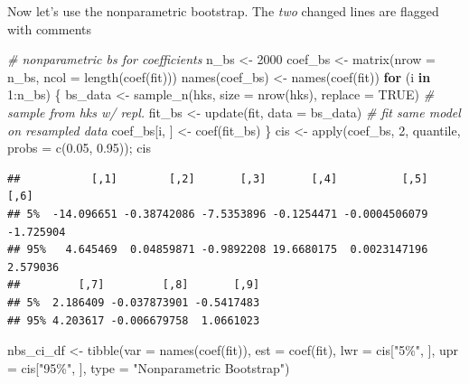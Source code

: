 \documentclass[
]{book}
\newenvironment{Shaded}{\begin{snugshade}}{\end{snugshade}}
\newcommand{\AttributeTok}[1]{\textcolor[rgb]{0.77,0.63,0.00}{#1}}
\newcommand{\CommentTok}[1]{\textcolor[rgb]{0.56,0.35,0.01}{\textit{#1}}}
\newcommand{\ConstantTok}[1]{\textcolor[rgb]{0.00,0.00,0.00}{#1}}
\newcommand{\ControlFlowTok}[1]{\textcolor[rgb]{0.13,0.29,0.53}{\textbf{#1}}}
\newcommand{\DecValTok}[1]{\textcolor[rgb]{0.00,0.00,0.81}{#1}}
\newcommand{\FloatTok}[1]{\textcolor[rgb]{0.00,0.00,0.81}{#1}}
\newcommand{\FunctionTok}[1]{\textcolor[rgb]{0.00,0.00,0.00}{#1}}
\newcommand{\NormalTok}[1]{#1}
\newcommand{\OtherTok}[1]{\textcolor[rgb]{0.56,0.35,0.01}{#1}}
\newcommand{\SpecialCharTok}[1]{\textcolor[rgb]{0.00,0.00,0.00}{#1}}
\newcommand{\StringTok}[1]{\textcolor[rgb]{0.31,0.60,0.02}{#1}}
\begin{document}
Now let's use the nonparametric bootstrap. The \emph{two} changed lines are flagged with comments

\begin{Shaded}
\begin{Highlighting}[]
\CommentTok{\# nonparametric bs for coefficients}
\NormalTok{n\_bs }\OtherTok{\textless{}{-}} \DecValTok{2000}  
\NormalTok{coef\_bs }\OtherTok{\textless{}{-}} \FunctionTok{matrix}\NormalTok{(}\AttributeTok{nrow =}\NormalTok{ n\_bs, }\AttributeTok{ncol =} \FunctionTok{length}\NormalTok{(}\FunctionTok{coef}\NormalTok{(fit)))}
\FunctionTok{names}\NormalTok{(coef\_bs) }\OtherTok{\textless{}{-}} \FunctionTok{names}\NormalTok{(}\FunctionTok{coef}\NormalTok{(fit))}
\ControlFlowTok{for}\NormalTok{ (i }\ControlFlowTok{in} \DecValTok{1}\SpecialCharTok{:}\NormalTok{n\_bs) \{}
\NormalTok{  bs\_data }\OtherTok{\textless{}{-}} \FunctionTok{sample\_n}\NormalTok{(hks, }\AttributeTok{size =} \FunctionTok{nrow}\NormalTok{(hks), }\AttributeTok{replace =} \ConstantTok{TRUE}\NormalTok{)  }\CommentTok{\# sample from hks w/ repl.}
\NormalTok{  fit\_bs }\OtherTok{\textless{}{-}} \FunctionTok{update}\NormalTok{(fit, }\AttributeTok{data =}\NormalTok{ bs\_data)                       }\CommentTok{\# fit same model on resampled data}
\NormalTok{  coef\_bs[i, ] }\OtherTok{\textless{}{-}} \FunctionTok{coef}\NormalTok{(fit\_bs)}
\NormalTok{\}}
\NormalTok{cis }\OtherTok{\textless{}{-}} \FunctionTok{apply}\NormalTok{(coef\_bs, }\DecValTok{2}\NormalTok{, quantile, }\AttributeTok{probs =} \FunctionTok{c}\NormalTok{(}\FloatTok{0.05}\NormalTok{, }\FloatTok{0.95}\NormalTok{)); cis}
\end{Highlighting}
\end{Shaded}

\begin{verbatim}
##           [,1]        [,2]       [,3]       [,4]          [,5]      [,6]
## 5%  -14.096651 -0.38742086 -7.5353896 -0.1254471 -0.0004506079 -1.725904
## 95%   4.645469  0.04859871 -0.9892208 19.6680175  0.0023147196  2.579036
##         [,7]         [,8]       [,9]
## 5%  2.186409 -0.037873901 -0.5417483
## 95% 4.203617 -0.006679758  1.0661023
\end{verbatim}

\begin{Shaded}
\begin{Highlighting}[]
\NormalTok{nbs\_ci\_df }\OtherTok{\textless{}{-}} \FunctionTok{tibble}\NormalTok{(}\AttributeTok{var =} \FunctionTok{names}\NormalTok{(}\FunctionTok{coef}\NormalTok{(fit)),}
                \AttributeTok{est =} \FunctionTok{coef}\NormalTok{(fit),}
                \AttributeTok{lwr =}\NormalTok{ cis[}\StringTok{"5\%"}\NormalTok{, ],}
                \AttributeTok{upr =}\NormalTok{ cis[}\StringTok{"95\%"}\NormalTok{, ], }
                \AttributeTok{type =} \StringTok{"Nonparametric Bootstrap"}\NormalTok{)}
\end{Highlighting}
\end{Shaded}
\end{document}
